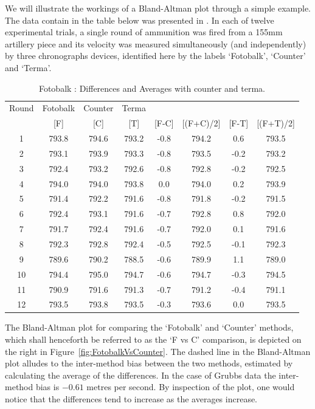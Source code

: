 \documentclass[12pt, a4paper]{report}
\theoremstyle{plain}
\theoremstyle{definition}
\theoremstyle{remark}
\begin{document}
We will illustrate the workings of a Bland-Altman plot through a simple example. The data contain in the table below was presented in \citep{Grubbs48}. In each of twelve experimental trials, a single round of ammunition was fired from a 155mm artillery piece and its velocity was measured simultaneously (and independently) by three chronographs devices, identified here by the labels `Fotobalk', `Counter' and `Terma'.
\begin{table}[h!]
	\renewcommand\arraystretch{0.7}%
	\begin{center}
		\begin{tabular}{|c||c|c|c||c|c|c|c|}
			\hline
			Round & Fotobalk  & Counter & Terma  &   &    &   &   \\
			&  [F] & [C] & [T] &[F-C] &  [(F+C)/2] & [F-T] &  [(F+T)/2] \\
			\hline
			1 & 793.8 & 794.6 & 793.2 & -0.8 & 794.2 & 0.6 & 793.5 \\
			2 & 793.1 & 793.9 & 793.3 & -0.8 & 793.5 & -0.2 & 793.2 \\
			3 & 792.4 & 793.2 & 792.6 & -0.8 & 792.8 & -0.2 & 792.5 \\
			4 & 794.0 & 794.0 & 793.8 & 0.0 & 794.0 & 0.2 & 793.9 \\
			5 & 791.4 & 792.2 & 791.6 & -0.8 & 791.8 & -0.2 & 791.5 \\
			6 & 792.4 & 793.1 & 791.6 & -0.7 & 792.8 & 0.8 & 792.0 \\
			7 & 791.7 & 792.4 & 791.6 & -0.7 & 792.0 & 0.1 & 791.6 \\
			8 & 792.3 & 792.8 & 792.4 & -0.5 & 792.5 & -0.1 & 792.3 \\
			9 & 789.6 & 790.2 & 788.5 & -0.6 & 789.9 & 1.1 & 789.0 \\
			10 & 794.4 & 795.0 & 794.7 & -0.6 & 794.7 & -0.3 & 794.5 \\
			11 & 790.9 & 791.6 & 791.3 & -0.7 & 791.2 & -0.4 & 791.1 \\
			12 & 793.5 & 793.8 & 793.5 & -0.3 & 793.6 & 0.0 & 793.5 \\
			\hline
		\end{tabular}
		\caption{Fotobalk : Differences and Averages with counter and terma.}
		\label{GrubbsData1}
	\end{center}
\end{table}
The Bland-Altman plot for comparing the `Fotobalk' and `Counter' methods, which shall henceforth be referred to as the `F vs C' comparison, is depicted on the right in Figure~\ref{fig:FotobalkVsCounter}. The dashed line in the Bland-Altman plot alludes to the inter-method bias between the two methods, estimated by calculating the average of the differences. In the case of Grubbs data the inter-method bias is $-0.61$ metres per second. By inspection of the plot, one would notice that the differences tend to increase as the averages increase.
\end{document}
